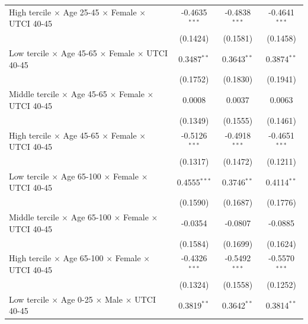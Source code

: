 \begin{table}[htbp]
\begin{tabular}{lccc}
      High tercile $\times$ Age 25-45 $\times$ Female $\times$ UTCI 40-45       & -0.4635$^{***}$ & -0.4838$^{***}$   & -0.4641$^{***}$\\   
                                                                                & (0.1424)        & (0.1581)          & (0.1458)\\   
      Low tercile $\times$ Age 45-65 $\times$ Female $\times$ UTCI 40-45        & 0.3487$^{**}$   & 0.3643$^{**}$     & 0.3874$^{**}$\\   
                                                                                & (0.1752)        & (0.1830)          & (0.1941)\\   
      Middle tercile $\times$ Age 45-65 $\times$ Female $\times$ UTCI 40-45     & 0.0008          & 0.0037            & 0.0063\\   
                                                                                & (0.1349)        & (0.1555)          & (0.1461)\\   
      High tercile $\times$ Age 45-65 $\times$ Female $\times$ UTCI 40-45       & -0.5126$^{***}$ & -0.4918$^{***}$   & -0.4651$^{***}$\\   
                                                                                & (0.1317)        & (0.1472)          & (0.1211)\\   
      Low tercile $\times$ Age 65-100 $\times$ Female $\times$ UTCI 40-45       & 0.4555$^{***}$  & 0.3746$^{**}$     & 0.4114$^{**}$\\   
                                                                                & (0.1590)        & (0.1687)          & (0.1776)\\   
      Middle tercile $\times$ Age 65-100 $\times$ Female $\times$ UTCI 40-45    & -0.0354         & -0.0807           & -0.0885\\   
                                                                                & (0.1584)        & (0.1699)          & (0.1624)\\   
      High tercile $\times$ Age 65-100 $\times$ Female $\times$ UTCI 40-45      & -0.4326$^{***}$ & -0.5492$^{***}$   & -0.5570$^{***}$\\   
                                                                                & (0.1324)        & (0.1558)          & (0.1252)\\   
      Low tercile $\times$ Age 0-25 $\times$ Male $\times$ UTCI 40-45           & 0.3819$^{**}$   & 0.3642$^{**}$     & 0.3814$^{**}$\\   

\end{tabular}
\end{table}
